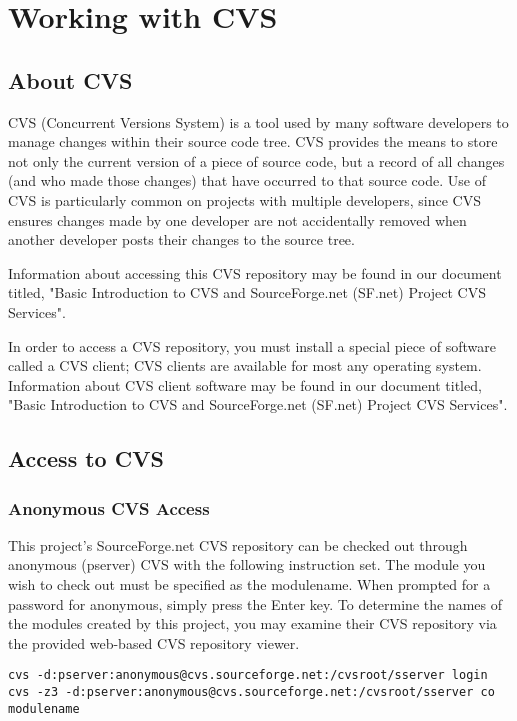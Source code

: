 
\chapter{Working with CVS}

\section{About CVS}
CVS (Concurrent Versions System) is a tool used by many software developers to manage 
changes within their source code tree. CVS provides the means to store not only the current 
version of a piece of source code, but a record of all changes (and who made those changes) 
that have occurred to that source code. Use of CVS is particularly common on projects with 
multiple developers, since CVS ensures changes made by one developer are not accidentally 
removed when another developer posts their changes to the source tree.

Information about accessing this CVS repository may be found in our document titled, 
"Basic Introduction to CVS and SourceForge.net (SF.net) Project CVS Services".

In order to access a CVS repository, you must install a special piece of software called a 
CVS client; CVS clients are available for most any operating system. 
Information about CVS client software may be found in our document titled, 
"Basic Introduction to CVS and SourceForge.net (SF.net) Project CVS Services".

\section{Access to CVS}

\subsection{Anonymous CVS Access}
This project's SourceForge.net CVS repository can be checked out through anonymous (pserver) 
CVS with the following instruction set. The module you wish to check out must be specified as 
the modulename. When prompted for a password for anonymous, simply press the Enter key. 
To determine the names of the modules created by this project, you may examine their CVS 
repository via the provided web-based CVS repository viewer.

\begin{verbatim}
cvs -d:pserver:anonymous@cvs.sourceforge.net:/cvsroot/sserver login
cvs -z3 -d:pserver:anonymous@cvs.sourceforge.net:/cvsroot/sserver co modulename
\end{verbatim}

